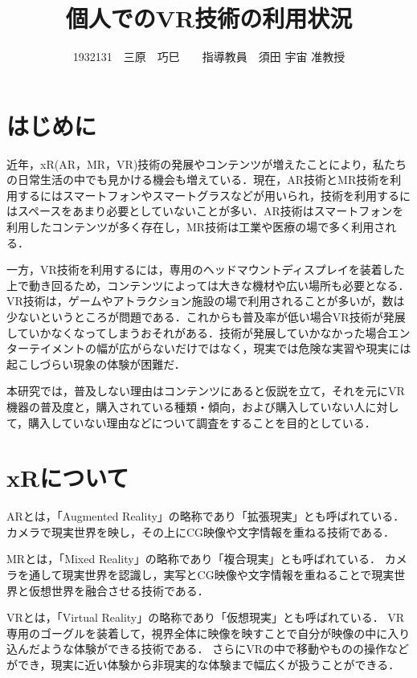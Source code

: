 \documentclass[twocolumn,10pt,a4j]{ltjsarticle}
\title{個人でのVR技術の利用状況}
\author{1932131　三原　巧巳　　指導教員　須田 宇宙 准教授}
\date{}
\begin{document}
\maketitle

\section{はじめに}
近年，xR(AR，MR，VR)技術の発展やコンテンツが増えたことにより，私たちの日常生活の中でも見かける機会も増えている．現在，AR技術とMR技術を利用するにはスマートフォンやスマートグラスなどが用いられ，技術を利用するにはスペースをあまり必要としていないことが多い．AR技術はスマートフォンを利用したコンテンツが多く存在し，MR技術は工業や医療の場で多く利用される．

一方，VR技術を利用するには，専用のヘッドマウントディスプレイを装着した上で動き回るため，コンテンツによっては大きな機材や広い場所も必要となる．VR技術は，ゲームやアトラクション施設の場で利用されることが多いが，数は少ないというところが問題である．これからも普及率が低い場合VR技術が発展していかなくなってしまうおそれがある．技術が発展していかなかった場合エンターテイメントの幅が広がらないだけではなく，現実では危険な実習や現実には起こしづらい現象の体験が困難だ．

本研究では，普及しない理由はコンテンツにあると仮説を立て，それを元にVR機器の普及度と，購入されている種類・傾向，および購入していない人に対して，購入していない理由などについて調査をすることを目的としている．

\section{xRについて}
ARとは，「Augmented Reality」の略称であり「拡張現実」とも呼ばれている．
カメラで現実世界を映し，その上にCG映像や文字情報を重ねる技術である．

MRとは，「Mixed Reality」の略称であり「複合現実」とも呼ばれている．
カメラを通して現実世界を認識し，実写とCG映像や文字情報を重ねることで現実世界と仮想世界を融合させる技術である．

VRとは，「Virtual Reality」の略称であり「仮想現実」とも呼ばれている．
VR専用のゴーグルを装着して，視界全体に映像を映すことで自分が映像の中に入り込んだような体験ができる技術である．
さらにVRの中で移動やものの操作などができ，現実に近い体験から非現実的な体験まで幅広くが扱うことができる．
\end{document}
